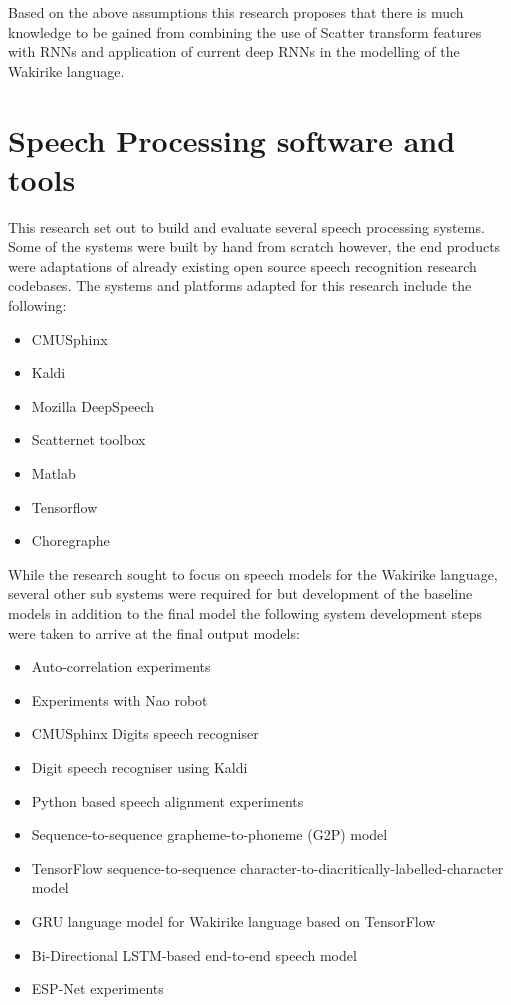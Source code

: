 Based on the above assumptions this research proposes that there is much knowledge to be gained from combining the use of Scatter transform features with RNNs and application of current deep RNNs in the modelling of the Wakirike language.

\section{Speech Processing software and tools}
This research set out to build and evaluate several speech processing systems.  Some of the systems were built by hand from scratch however, the end products were adaptations of already existing open source speech recognition research codebases.  The systems and platforms adapted for this research include the following:
\begin{itemize}
    \item CMUSphinx
    \item Kaldi
    \item Mozilla DeepSpeech
    \item Scatternet toolbox
    \item Matlab
    \item Tensorflow
    \item Choregraphe
\end{itemize}

While the research sought to focus on speech models for the Wakirike language, several other sub systems were required for but development of the baseline models in addition to the final model the following system development steps were taken to arrive at the final output models:
\begin{itemize}
    \item Auto-correlation experiments
    \item Experiments with Nao robot
    \item CMUSphinx Digits speech recogniser
    \item Digit speech recogniser using Kaldi
    \item Python based speech alignment experiments
    \item Sequence-to-sequence grapheme-to-phoneme (G2P) model
    \item TensorFlow sequence-to-sequence character-to-diacritically-labelled-character model
    \item GRU language model for Wakirike language based on TensorFlow
    \item Bi-Directional LSTM-based end-to-end speech model
    \item ESP-Net experiments
\end{itemize}

